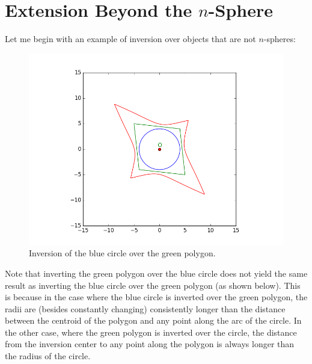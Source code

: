 \documentclass[a4paper,12pt]{article}
\numberwithin{figure}{section}
\begin{document}
    \section{Extension Beyond the $n$-Sphere}
    
        Let me begin with an example of inversion over objects that are not $n$-spheres:
        
        \begin{figure}[H]
            \centering
            \includegraphics[scale=0.6]{./pictures/INVERT_CIRCLE_POLY}
            \caption{Inversion of the blue circle over the green polygon.}
            \label{fig:invcpoly}
        \end{figure}
        
        Note that inverting the green polygon over the blue circle does not yield the same result as inverting the blue circle over the green polygon (as shown below). This is because in the case where the blue circle is inverted over the green polygon, the radii are (besides constantly changing) consistently longer than the distance between the centroid of the polygon and any point along the arc of the circle. In the other case, where the green polygon is inverted over the circle, the distance from the inversion center to any point along the polygon is always longer than the radius of the circle.
        
\end{document}
